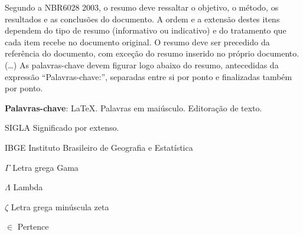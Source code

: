 \documentclass[
    12pt,				%
    a4paper,            %
    oneside,			%
    openright,			%
    ruledheader,
    anapcustomindent,
    sumario = tradicional,
    abntfigtabnum,
    tocpage=plain,
    english,			%
	brazil,				%
    ]{abntex-ifsuldeminas/abntex2-trabalho} %
\begin{document}

\frenchspacing 

\pretextual

\imprimircapa

\imprimirfolhaderosto


\setlength{\absparsep}{18pt} %
\begin{resumo}
 Segundo a NBR6028 2003, o resumo deve ressaltar o
 objetivo, o método, os resultados e as conclusões do documento. A ordem e a extensão
 destes itens dependem do tipo de resumo (informativo ou indicativo) e do
 tratamento que cada item recebe no documento original. O resumo deve ser
 precedido da referência do documento, com exceção do resumo inserido no
 próprio documento. (\ldots) As palavras-chave devem figurar logo abaixo do
 resumo, antecedidas da expressão ``Palavras-chave:'', separadas entre si por
 ponto e finalizadas também por ponto.

 \textbf{Palavras-chave}: \LaTeX. Palavras em maiúsculo. Editoração de texto.
\end{resumo}

\listoffigures*
\cleardoublepage

\listoftables*
\cleardoublepage

\begin{siglas}
  \item [SIGLA] Significado por extenso. 
  \item [IBGE] Instituto Brasileiro de Geografia e Estatística
\end{siglas}

\begin{simbolos}
  \item[$ \Gamma $] Letra grega Gama
  \item[$ \Lambda $] Lambda
  \item[$ \zeta $] Letra grega minúscula zeta
  \item[$ \in $] Pertence
\end{simbolos}
\end{document}
